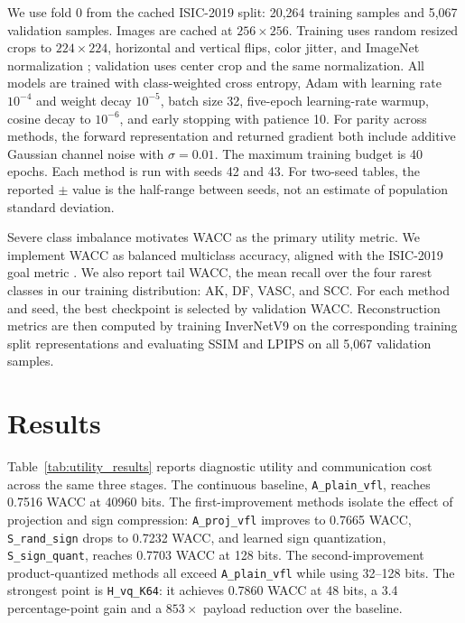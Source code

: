 \documentclass{article}
\begin{document}
We use fold 0 from the cached ISIC-2019 split: 20,264 training samples and 5,067 validation samples. Images are cached at $256 \times 256$. Training uses random resized crops to $224 \times 224$, horizontal and vertical flips, color jitter, and ImageNet normalization \citep{deng2009imagenet}; validation uses center crop and the same normalization. All models are trained with class-weighted cross entropy, Adam \citep{kingma2015adam} with learning rate $10^{-4}$ and weight decay $10^{-5}$, batch size 32, five-epoch learning-rate warmup, cosine decay to $10^{-6}$, and early stopping with patience 10. For parity across methods, the forward representation and returned gradient both include additive Gaussian channel noise with $\sigma=0.01$. The maximum training budget is 40 epochs. Each method is run with seeds 42 and 43. For two-seed tables, the reported $\pm$ value is the half-range between seeds, not an estimate of population standard deviation.

Severe class imbalance motivates WACC as the primary utility metric. We implement WACC as balanced multiclass accuracy, aligned with the ISIC-2019 goal metric \citep{isic2019challenge}. We also report tail WACC, the mean recall over the four rarest classes in our training distribution: AK, DF, VASC, and SCC. For each method and seed, the best checkpoint is selected by validation WACC. Reconstruction metrics are then computed by training InverNetV9 on the corresponding training split representations and evaluating SSIM \citep{wang2004ssim} and LPIPS \citep{zhang2018lpips} on all 5,067 validation samples.

\section{Results}
Table~\ref{tab:utility_results} reports diagnostic utility and communication cost across the same three stages. The continuous baseline, \texttt{A\_plain\_vfl}, reaches 0.7516 WACC at 40960 bits. The first-improvement methods isolate the effect of projection and sign compression: \texttt{A\_proj\_vfl} improves to 0.7665 WACC, \texttt{S\_rand\_sign} drops to 0.7232 WACC, and learned sign quantization, \texttt{S\_sign\_quant}, reaches 0.7703 WACC at 128 bits. The second-improvement product-quantized methods all exceed \texttt{A\_plain\_vfl} while using 32--128 bits. The strongest point is \texttt{H\_vq\_K64}: it achieves 0.7860 WACC at 48 bits, a 3.4 percentage-point gain and a $853\times$ payload reduction over the baseline.
\end{document}
